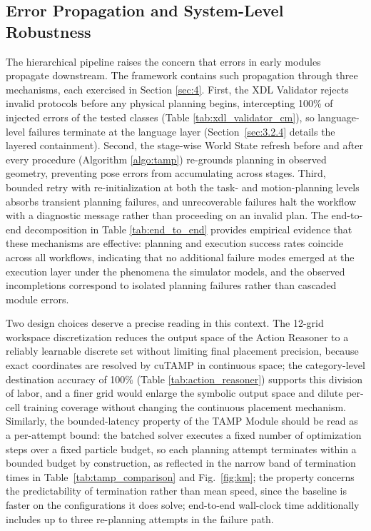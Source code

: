 \documentclass{ieeeaccess}
\newif\ifhighlight
\newcommand{\rev}[1]{\ifhighlight\hl{#1}\else#1\fi}
\begin{document}
\subsection{Error Propagation and System-Level Robustness}\label{sec:5.4}
The hierarchical pipeline raises the concern that errors in early modules propagate downstream. The framework contains such propagation through three mechanisms, each exercised in Section \ref{sec:4}. First, the XDL Validator rejects invalid protocols before any physical planning begins, intercepting 100\% of injected errors \rev{of the tested classes} (Table \ref{tab:xdl_validator_cm}), so language-level failures terminate at the language layer \rev{(Section~\ref{sec:3.2.4} details the layered containment)}. Second, the stage-wise World State refresh before and after every procedure (Algorithm \ref{algo:tamp}) re-grounds planning in observed geometry, preventing pose errors from accumulating across stages. Third, bounded retry with re-initialization at both the task- and motion-planning levels absorbs transient planning failures, and unrecoverable failures halt the workflow with a diagnostic message rather than proceeding on an invalid plan. The end-to-end decomposition in Table \ref{tab:end_to_end} provides empirical evidence that these mechanisms are effective: planning and execution success rates coincide across all workflows, indicating that no additional failure modes \rev{emerged at the execution layer under the phenomena the simulator models}, and the observed incompletions correspond to isolated planning failures rather than cascaded module errors.

Two design choices deserve a precise reading in this context. The 12-grid workspace discretization reduces the output space of the Action Reasoner to a reliably learnable discrete set without limiting final placement precision, because exact coordinates are resolved by cuTAMP in continuous space; the category-level destination accuracy of 100\% (Table \ref{tab:action_reasoner}) supports this division of labor, and a finer grid would enlarge the symbolic output space and dilute per-cell training coverage without changing the continuous placement mechanism. Similarly, the bounded-latency property of the TAMP Module should be read as a per-attempt bound: the batched solver executes a fixed number of optimization steps over a fixed particle budget, so each planning attempt terminates within a bounded budget by construction, \rev{as reflected in the narrow band of termination times in Table~\ref{tab:tamp_comparison} and Fig.~\ref{fig:km}; the property concerns the predictability of termination rather than mean speed, since the baseline is faster on the configurations it does solve}; end-to-end wall-clock time additionally includes up to three re-planning attempts in the failure path.
\end{document}
